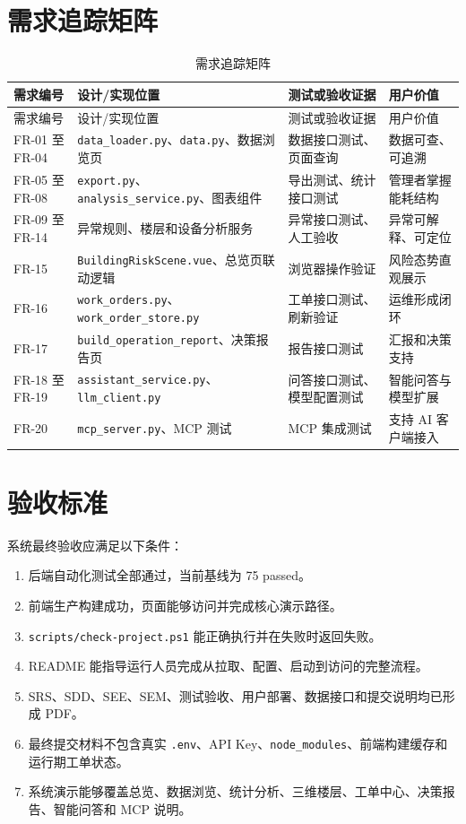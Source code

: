 \documentclass[12pt,a4paper]{ctexart}
\newcommand{\code}[1]{{\footnotesize\nolinkurl{#1}}}
\begin{document}
\section{需求追踪矩阵}
\begin{longtable}{p{2.2cm}p{4.2cm}p{4.2cm}p{3.5cm}}
\caption{需求追踪矩阵}\\
\toprule
需求编号 & 设计/实现位置 & 测试或验收证据 & 用户价值 \\
\midrule
\endfirsthead
\toprule
需求编号 & 设计/实现位置 & 测试或验收证据 & 用户价值 \\
\midrule
\endhead
FR-01 至 FR-04 & \code{data_loader.py}、\code{data.py}、数据浏览页 & 数据接口测试、页面查询 & 数据可查、可追溯 \\
FR-05 至 FR-08 & \code{export.py}、\code{analysis_service.py}、图表组件 & 导出测试、统计接口测试 & 管理者掌握能耗结构 \\
FR-09 至 FR-14 & 异常规则、楼层和设备分析服务 & 异常接口测试、人工验收 & 异常可解释、可定位 \\
FR-15 & \code{BuildingRiskScene.vue}、总览页联动逻辑 & 浏览器操作验证 & 风险态势直观展示 \\
FR-16 & \code{work_orders.py}、\code{work_order_store.py} & 工单接口测试、刷新验证 & 运维形成闭环 \\
FR-17 & \code{build_operation_report}、决策报告页 & 报告接口测试 & 汇报和决策支持 \\
FR-18 至 FR-19 & \code{assistant_service.py}、\code{llm_client.py} & 问答接口测试、模型配置测试 & 智能问答与模型扩展 \\
FR-20 & \code{mcp_server.py}、MCP 测试 & MCP 集成测试 & 支持 AI 客户端接入 \\
\bottomrule
\end{longtable}

\section{验收标准}
系统最终验收应满足以下条件：
\begin{enumerate}
    \item 后端自动化测试全部通过，当前基线为 75 passed。
    \item 前端生产构建成功，页面能够访问并完成核心演示路径。
    \item \code{scripts/check-project.ps1} 能正确执行并在失败时返回失败。
    \item README 能指导运行人员完成从拉取、配置、启动到访问的完整流程。
    \item SRS、SDD、SEE、SEM、测试验收、用户部署、数据接口和提交说明均已形成 PDF。
    \item 最终提交材料不包含真实 \code{.env}、API Key、\code{node_modules}、前端构建缓存和运行期工单状态。
    \item 系统演示能够覆盖总览、数据浏览、统计分析、三维楼层、工单中心、决策报告、智能问答和 MCP 说明。
\end{enumerate}
\end{document}
